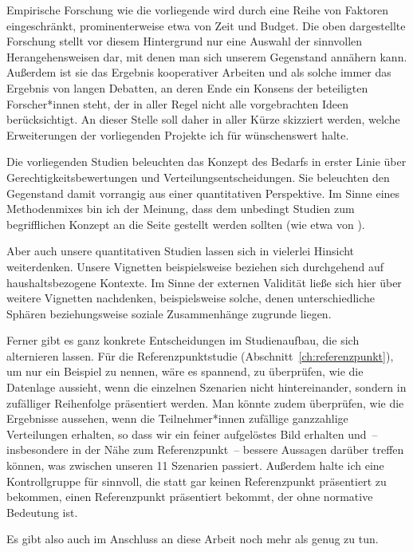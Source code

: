 \documentclass[justified,nobib,nohyper,symmetric,twoside]{tufte-book}
\begin{document}
Empirische Forschung wie die vorliegende wird durch eine Reihe von Faktoren eingeschränkt, prominenterweise etwa von Zeit und Budget.
Die oben dargestellte Forschung stellt vor diesem Hintergrund nur eine Auswahl der sinnvollen Herangehensweisen dar, mit denen man sich unserem Gegenstand annähern kann.
Außerdem ist sie das Ergebnis kooperativer Arbeiten und als solche immer das Ergebnis von langen Debatten, an deren Ende ein Konsens der beteiligten Forscher*innen steht, der in aller Regel nicht alle vorgebrachten Ideen berücksichtigt.
An dieser Stelle soll daher in aller Kürze skizziert werden, welche Erweiterungen der vorliegenden Projekte ich für wünschenswert halte.

Die vorliegenden Studien beleuchten das Konzept des Bedarfs in erster Linie über Gerechtigkeitsbewertungen und Verteilungsentscheidungen.
Sie beleuchten den Gegenstand damit vorrangig aus einer quantitativen Perspektive.
Im Sinne eines Methodenmixes bin ich der Meinung, dass dem unbedingt Studien zum begrifflichen Konzept an die Seite gestellt werden sollten (wie etwa von \cite{poelzler_typicality_2022}).

Aber auch unsere quantitativen Studien lassen sich in vielerlei Hinsicht weiterdenken.
Unsere Vignetten beispielsweise beziehen sich durchgehend auf haushaltsbezogene Kontexte.
Im Sinne der externen Validität ließe sich hier über weitere Vignetten nachdenken, beispielsweise solche, denen unterschiedliche Sphären beziehungsweise soziale Zusammenhänge zugrunde liegen.

Ferner gibt es ganz konkrete Entscheidungen im Studienaufbau, die sich alternieren lassen.
Für die Referenzpunktstudie (Abschnitt~\ref{ch:referenzpunkt}), um nur ein Beispiel zu nennen, wäre es spannend, zu überprüfen, wie die Datenlage aussieht, wenn die einzelnen Szenarien nicht hintereinander, sondern in zufälliger Reihenfolge präsentiert werden.
Man könnte zudem überprüfen, wie die Ergebnisse aussehen, wenn die Teilnehmer*innen zufällige ganzzahlige Verteilungen erhalten, so dass wir ein feiner aufgelöstes Bild erhalten und~-- insbesondere in der Nähe zum Referenzpunkt~-- bessere Aussagen darüber treffen können, was zwischen unseren 11 Szenarien passiert. Außerdem halte ich eine Kontrollgruppe für sinnvoll, die statt gar keinen Referenzpunkt präsentiert zu bekommen, einen Referenzpunkt präsentiert bekommt, der ohne normative Bedeutung ist.

Es gibt also auch im Anschluss an diese Arbeit noch mehr als genug zu tun.


\backmatter
{}
\printbibliography[title={Bibliographie}]
\end{document}
